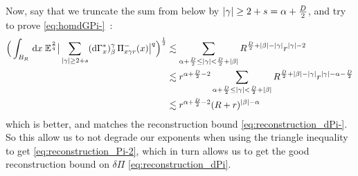 Now, say that we truncate the sum from below by $\lvert\gamma\rvert \geq 2+s = \alpha + \frac{D}{2}$, and try to prove \eqref{eq:homdGPi-}~:
\begin{align*}
    \Big(\int_{B_R} \,\mathrm{d} x\; \mathbb{E}^{\frac{2}{q}}\big| \sum_{\lvert\gamma\rvert \geq 2+s} (\mathrm{d}\Gamma^*_x)^\gamma_\beta\,\Pi^-_{x\gamma r}(x)\big|^q\Big)^{\frac{1}{2}} &\lesssim \sum_{ \alpha + \frac{D}{2} \leq \lvert\gamma\rvert < \frac{D}{2}+\lvert\beta\rvert} R^{\frac{D}{2}+\lvert\beta\rvert - \lvert\gamma\rvert} r^{\lvert\gamma\rvert - 2} \\
    &\lesssim r^{\alpha + \frac{D}{2} - 2} \sum_{ \alpha + \frac{D}{2} \leq \lvert\gamma\rvert < \frac{D}{2}+\lvert\beta\rvert} R^{\frac{D}{2}+\lvert\beta\rvert - \lvert\gamma\rvert} r^{\lvert\gamma\rvert - \alpha - \frac{D}{2}}\\
    &\lesssim r^{\alpha + \frac{D}{2} - 2} (R+r)^{\lvert\beta\rvert - \alpha} 
\end{align*}
which is better, and matches the reconstruction bound \eqref{eq:reconstruction_dPi-}. So this allow us to not degrade our exponents when using the triangle inequality to get \eqref{eq:reconstruction_Pi-2}, which in turn allows us to get the good reconstruction bound on $\delta \Pi$ \eqref{eq:reconstruction_dPi}. 